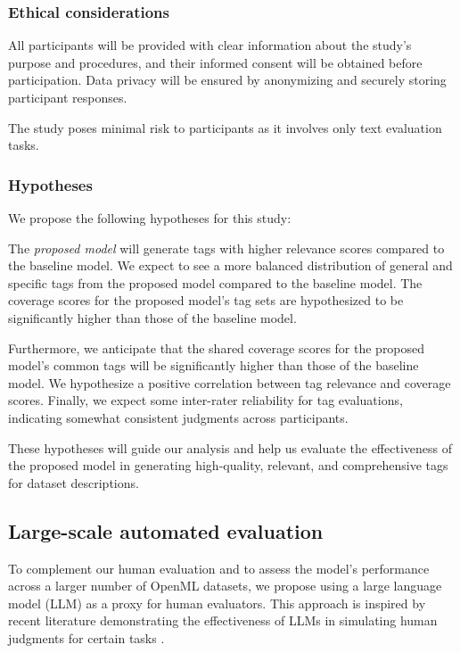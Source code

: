 \subsubsection{Ethical considerations}
All participants will be provided with clear information about the study's purpose and procedures, and their informed consent will be obtained before participation. Data privacy will be ensured by anonymizing and securely storing participant responses.

The study poses minimal risk to participants as it involves only text evaluation tasks.


\subsubsection{Hypotheses}
We propose the following hypotheses for this study:

The \textit{proposed model} will generate tags with higher relevance scores compared to the baseline model. We expect to see a more balanced distribution of general and specific tags from the proposed model compared to the baseline model. The coverage scores for the proposed model's tag sets are hypothesized to be significantly higher than those of the baseline model.

Furthermore, we anticipate that the shared coverage scores for the proposed model's common tags will be significantly higher than those of the baseline model. We hypothesize a positive correlation between tag relevance and coverage scores. Finally, we expect some inter-rater reliability for tag evaluations, indicating somewhat consistent judgments across participants.

These hypotheses will guide our analysis and help us evaluate the effectiveness of the proposed model in generating high-quality, relevant, and comprehensive tags for dataset descriptions.

\subsection{Large-scale automated evaluation}
\label{sec:large_scale_evaluation}

To complement our human evaluation and to assess the model's performance across a larger number of OpenML datasets, we propose using a large language model (LLM) as a proxy for human evaluators. This approach is inspired by recent literature demonstrating the effectiveness of LLMs in simulating human judgments for certain tasks \cite{musil_exploring_2024}.

